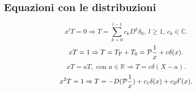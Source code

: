 \subsection*{Equazioni con le distribuzioni}
\[
    x^lT = 0 \Rightarrow T = \sum_{k=0}^{l-1}c_kD^k\delta_0,\ l\ge1,\,c_k\in\mathbb{C}.
\]
\[
    xT=1 \Rightarrow T = T_\text{P}+T_0 = \mathcal{P}\frac{1}{x}+c\delta(x).
\]
\[
    xT = aT,\text{ con $a\in\mathbb{R}$}\Rightarrow T = c\delta(X-a).
\]
\[
    x^2T = 1 \Rightarrow T = -D(\mathcal{P}\frac{1}{x})+c_1\delta(x)+c_2\delta'(x).
\]